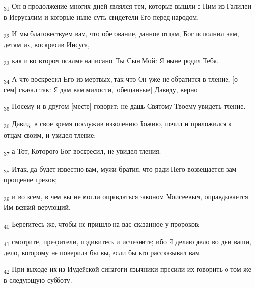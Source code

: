 \begin{tcolorbox}
\textsubscript{31} Он в продолжение многих дней являлся тем, которые вышли с Ним из Галилеи в Иерусалим и которые ныне суть свидетели Его перед народом.
\end{tcolorbox}
\begin{tcolorbox}
\textsubscript{32} И мы благовествуем вам, что обетование, данное отцам, Бог исполнил нам, детям их, воскресив Иисуса,
\end{tcolorbox}
\begin{tcolorbox}
\textsubscript{33} как и во втором псалме написано: Ты Сын Мой: Я ныне родил Тебя.
\end{tcolorbox}
\begin{tcolorbox}
\textsubscript{34} А что воскресил Его из мертвых, так что Он уже не обратится в тление, [о сем] сказал так: Я дам вам милости, [обещанные] Давиду, верно.
\end{tcolorbox}
\begin{tcolorbox}
\textsubscript{35} Посему и в другом [месте] говорит: не дашь Святому Твоему увидеть тление.
\end{tcolorbox}
\begin{tcolorbox}
\textsubscript{36} Давид, в свое время послужив изволению Божию, почил и приложился к отцам своим, и увидел тление;
\end{tcolorbox}
\begin{tcolorbox}
\textsubscript{37} а Тот, Которого Бог воскресил, не увидел тления.
\end{tcolorbox}
\begin{tcolorbox}
\textsubscript{38} Итак, да будет известно вам, мужи братия, что ради Него возвещается вам прощение грехов;
\end{tcolorbox}
\begin{tcolorbox}
\textsubscript{39} и во всем, в чем вы не могли оправдаться законом Моисеевым, оправдывается Им всякий верующий.
\end{tcolorbox}
\begin{tcolorbox}
\textsubscript{40} Берегитесь же, чтобы не пришло на вас сказанное у пророков:
\end{tcolorbox}
\begin{tcolorbox}
\textsubscript{41} смотрите, презрители, подивитесь и исчезните; ибо Я делаю дело во дни ваши, дело, которому не поверили бы вы, если бы кто рассказывал вам.
\end{tcolorbox}
\begin{tcolorbox}
\textsubscript{42} При выходе их из Иудейской синагоги язычники просили их говорить о том же в следующую субботу.
\end{tcolorbox}
